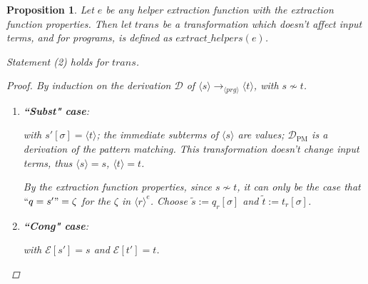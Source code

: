 \documentclass[11pt]{article} %
\newtheorem{proposition}{Proposition}
\begin{document}
\begin{proposition}

Let $e$ be any helper extraction function with the extraction function properties. Then let $trans$ be a transformation which doesn't affect input terms, and for programs, is defined as $extract\_helpers(e)$.

Statement (2) holds for $trans$.

\begin{proof} By induction on the derivation $\mathcal{D}$ of $\langle s \rangle \longrightarrow_{\langle prg \rangle} \langle t \rangle$, with $s \not\sim t$.

\begin{enumerate}
\item \textbf{``Subst" case}:

\begin{prooftree}
\end{prooftree}

with $s'[\sigma] = \langle t \rangle$; the immediate subterms of $\langle s \rangle$ are values; $\mathcal{D}_{\textrm{PM}}$ is a derivation of the pattern matching. This transformation doesn't change input terms, thus $\langle s \rangle = s$, $\langle t \rangle = t$.

By the extraction function properties, since $s \not\sim t$, it can only be the case that $`` q = s' " = \zeta$ for the $\zeta$ in $\langle r \rangle^e$. Choose $\widetilde{s} := q_r[\sigma]$ and $\widetilde{t} := t_r[\sigma]$.

\item \textbf{``Cong" case}:

\begin{prooftree}
\end{prooftree}

with $\mathcal{E}[s'] = s$ and $\mathcal{E}[t'] = t$.


\end{enumerate}
\end{proof}
\end{proposition}
\end{document}
